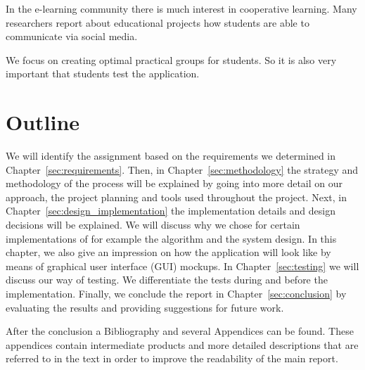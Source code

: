 In the e-learning community there is much interest in cooperative learning. 
Many researchers report about educational projects how students are able to communicate via social media.\cite{rothkrantz2014elearning}

We focus on creating optimal practical groups for students.
So it is also very important that students test the application.

\section{Outline}
We will identify the assignment based on the requirements we determined in Chapter~\ref{sec:requirements}. 
Then, in Chapter~\ref{sec:methodology} the strategy and methodology of the process will be explained by going into more detail on our approach, the project planning and tools used throughout the project.
Next, in Chapter~\ref{sec:design_implementation} the implementation details and design decisions will be explained.
We will discuss why we chose for certain implementations of for example the algorithm and the system design.
In this chapter, we also give an impression on how the application will look like by means of graphical user interface (GUI) mockups.
In Chapter~\ref{sec:testing} we will discuss our way of testing. 
We differentiate the tests during and before the implementation.
Finally, we conclude the report in Chapter~\ref{sec:conclusion} by evaluating the results and providing suggestions for future work.

After the conclusion a Bibliography and several Appendices can be found. 
These appendices contain intermediate products and more detailed descriptions that are referred to in the text in order to improve the readability of the main report.
